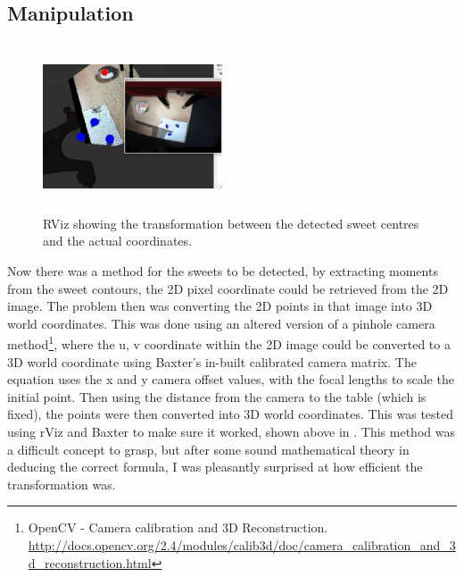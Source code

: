 \subsection{Manipulation}
\captionsetup[figure]{justification=centering}
\begin{figure}[H]
        \centering 
        \includegraphics[width=0.475\textwidth, height=5cm]{sweettransformation.jpg}
        \caption{RViz showing the transformation between the detected sweet centres and the actual coordinates.}
        \label{fig:transformationsweets}
\end{figure}
Now there was a method for the sweets to be detected, by extracting moments from the sweet contours, the 2D pixel coordinate could be retrieved from the 2D image. The problem then was converting the 2D points in that image into 3D world coordinates. This was done using an altered version of a pinhole camera method\footnote{OpenCV - Camera calibration and 3D Reconstruction. \url{http://docs.opencv.org/2.4/modules/calib3d/doc/camera\_calibration\_and\_3d\_reconstruction.html}}, where the u, v coordinate within the 2D image could be converted to a 3D world coordinate using Baxter's in-built calibrated camera matrix. The equation uses the x and y camera offset values, with the focal lengths to scale the initial point. Then using the distance from the camera to the table (which is fixed), the points were then converted into 3D world coordinates. This was tested using rViz and Baxter to make sure it worked, shown above in \textbf{}. This method was a difficult concept to grasp, but after some sound mathematical theory in deducing the correct formula, I was pleasantly surprised at how efficient the transformation was.
